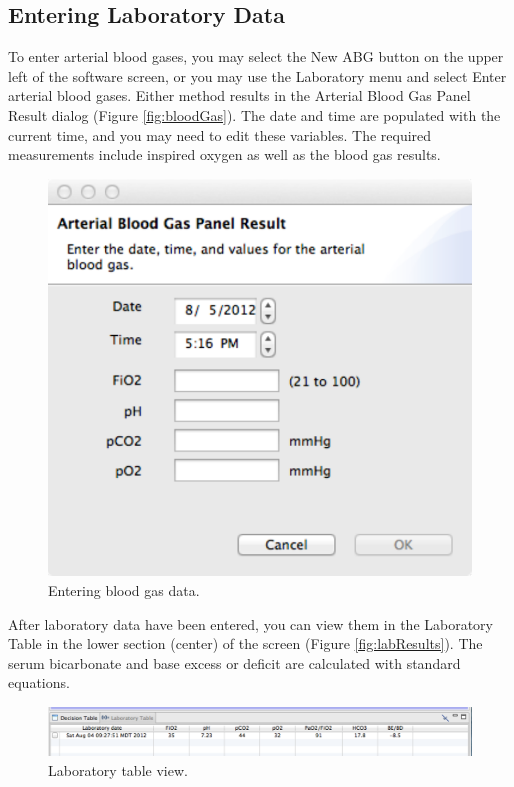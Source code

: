 \subsection{Entering Laboratory Data}
To enter arterial blood gases, you may select the New ABG button on the upper left of the software screen, or you may use
the Laboratory menu and select Enter arterial blood gases.  Either method results in the Arterial Blood Gas Panel Result dialog 
(Figure \vref{fig:bloodGas}).  The date and time are populated with the current time, and you may need to edit these
variables.  The required measurements include inspired oxygen as well as the blood gas results.  \\

\begin{figure}[htbp] 
   \centering
   \includegraphics[width=\textwidth]{NewBloodGas} 
   \caption{Entering blood gas data.}
   \label{fig:bloodGas}
\end{figure}

After laboratory data have been entered, you can view them in the Laboratory Table in the lower section (center) of
the screen (Figure \vref{fig:labResults}).  The serum bicarbonate and base excess or deficit are calculated with standard equations.\\

\begin{figure}[htbp] 
   \centering
   \includegraphics[width=\textwidth]{LaboratoryTable} 
   \caption{Laboratory table view.}
   \label{fig:labResults}
\end{figure}


